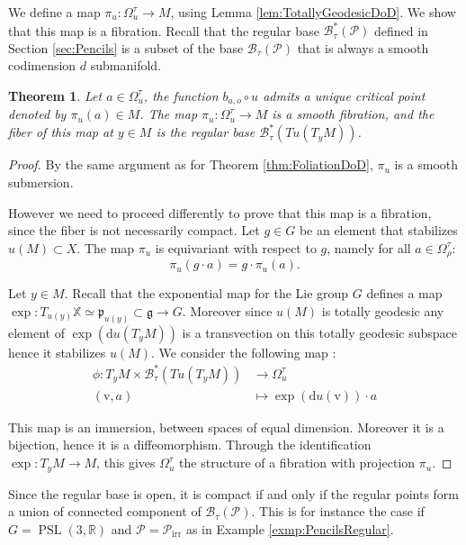 \documentclass[reqno,10pt]{amsart}
\theoremstyle{plain}
\newtheorem{thm}{Theorem}[section]
\theoremstyle{definition}
\theoremstyle{remark}
\newcommand{\type}{\tau}
\newcommand{\R}{\mathbb{R}}
\DeclareMathOperator{\PSL}{PSL}
\newcommand{\X}{\mathbb{X}}
\newcommand{\ie}{namely }
\begin{document}
We define a map $\pi_u:\Omega^\type_u\to M$, using Lemma \ref{lem:TotallyGeodesicDoD}. We show that this map is a fibration. Recall that the regular base $\mathcal{B}^*_\type(\mathcal{P})$ defined in Section \ref{sec:Pencils} is a subset of the base $\mathcal{B}_\type(\mathcal{P})$ that is always a smooth codimension $d$ submanifold.

\begin{thm}
\label{thm:TotallyGeodesicFibration}
Let $a\in \Omega^\type_u$, the function $b_{a,o}\circ u$ admits a unique critical point denoted by $\pi_u(a)\in M$.
The map $\pi_u:\Omega_u^\type\to M$ is a smooth fibration, and the fiber of this map at $y\in M$ is the regular base $\mathcal{B}^*_\type(Tu(T_yM))$.
\end{thm}

\begin{proof}
By the same argument as for Theorem \ref{thm:FoliationDoD},
$\pi_u$ is a smooth submersion. 

\medskip

However we need to proceed differently to prove that this map is a fibration, since the fiber is not necessarily compact.
Let $g\in G$ be an element that stabilizes $u(M)\subset X$. The map $\pi_u$ is equivariant with respect to $g$, \ie for all $a\in \Omega^\type_\rho$:
$$\pi_u(g\cdot a)=g\cdot \pi_u(a).$$

 Let $y\in M$. Recall that the exponential map for the Lie group $G$ defines a map $\exp:T_{u(y)}\X\simeq \mathfrak{p}_{u(y)}\subset \mathfrak{g}\to G$. Moreover since $u(M)$ is totally geodesic any element of $\exp\left(\mathrm{d}u(T_yM)\right)$ is a transvection on this totally geodesic subspace hence it stabilizes $u(M)$. We consider the following map :
 \begin{align*} 
  \phi:T_yM\times \mathcal{B}^*_\type(Tu(T_yM))&\longrightarrow \Omega^\type_u \\
  (\mathrm{v},a)& \longmapsto \exp\left(\mathrm{d}u(\mathrm{v})\right)\cdot a 
  \end{align*}
  
This map is an immersion, between spaces of equal dimension. Moreover it is a bijection, hence it is a diffeomorphism. Through the identification $\exp:T_yM\to M$, this gives $\Omega^\type_u$ the structure of a fibration with projection $\pi_u$.
\end{proof}

Since the regular base is open, it is compact if and only if the regular points form a union of connected component of $\mathcal{B}_\type(\mathcal{P})$. This is for instance the case if $G=\PSL(3,\R)$ and $\mathcal{P}=\mathcal{P}_\text{irr}$ as in Example \ref{exmp:PencilsRegular}.
\end{document}
